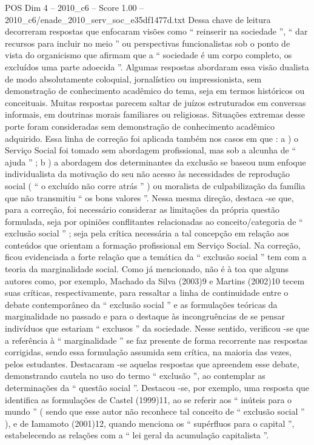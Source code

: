 \begin{textsample}{POS Dim 4 – 2010\_c6 – Score 1.00 – 2010\_c6/enade\_2010\_serv\_soc\_e35df1477d.txt}
Dessa chave de leitura decorreram respostas que enfocaram visões como “ reinserir na sociedade ”, “ dar recursos para incluir no meio ” ou perspectivas funcionalistas sob o ponto de vista do organicismo que afirmam que a “ sociedade é um corpo completo, os excluídos uma parte adoecida ”.
Algumas respostas abordaram essa visão dualista de modo absolutamente coloquial, jornalístico ou impressionista, sem demonstração de conhecimento acadêmico do tema, seja em termos históricos ou conceituais.
Muitas respostas parecem saltar de juízos estruturados em conversas informais, em doutrinas morais familiares ou religiosas.
Situações extremas desse porte foram consideradas sem demonstração de conhecimento acadêmico adquirido.
Essa linha de correção foi aplicada também nos casos em que : a ) o Serviço Social foi tomado sem abordagem profissional, mas sob a alcunha de “ ajuda ” ; b ) a abordagem dos determinantes da exclusão se baseou num enfoque individualista da motivação do seu não acesso às necessidades de reprodução social ( “ o excluído não corre atrás ” ) ou moralista de culpabilização da família que não transmitiu “ os bons valores ”.
Nessa mesma direção, destaca -se que, para a correção, foi necessário considerar as limitações da própria questão formulada, seja por opiniões conflitantes relacionadas ao conceito/categoria de “ exclusão social ” ; seja pela crítica necessária a tal concepção em relação aos conteúdos que orientam a formação profissional em Serviço Social.
Na correção, ficou evidenciada a forte relação que a temática da “ exclusão social ” tem com a teoria da marginalidade social.
Como já mencionado, não é à toa que alguns autores como, por exemplo, Machado da Silva (2003)9 e Martins (2002)10 tecem suas críticas, respectivamente, para ressaltar a linha de continuidade entre o debate contemporâneo da “ exclusão social ” e as formulações teóricas da marginalidade no passado e para o destaque às incongruências de se pensar indivíduos que estariam “ exclusos ” da sociedade.
Nesse sentido, verificou -se que a referência à “ marginalidade ” se faz presente de forma recorrente nas respostas corrigidas, sendo essa formulação assumida sem crítica, na maioria das vezes, pelos estudantes.
Destacaram -se aquelas respostas que apreendem esse debate, demonstrando cautela no uso do termo “ exclusão ”, ao contemplar as determinações da “ questão social ”.
Destacou -se, por exemplo, uma resposta que identifica as formulações de Castel (1999)11, ao se referir aos “ inúteis para o mundo ” ( sendo que esse autor não reconhece tal conceito de “ exclusão social ” ), e de Iamamoto (2001)12, quando menciona os “ supérfluos para o capital ”, estabelecendo as relações com a “ lei geral da acumulação capitalista ”.

\end{textsample}
